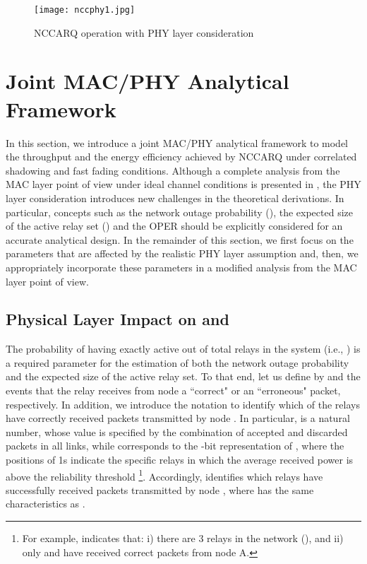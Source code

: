 \documentclass[12pt,draftcls, onecolumn]{IEEEtran}
\begin{document}
\begin{figure}[htb]
\centering
\texttt{[image: nccphy1.jpg]}
\caption{NCCARQ operation with PHY layer consideration}\label{nccphy}
\end{figure}


\section{Joint MAC/PHY Analytical Framework}
\label{sec:analysis}

In this section, we introduce a joint MAC/PHY analytical framework to model the throughput and the energy efficiency achieved by NCCARQ under correlated shadowing and fast fading conditions. Although a complete analysis from the MAC layer point of view under ideal channel conditions is presented in \cite{nccarq}, the PHY layer consideration introduces new challenges in the theoretical derivations. In particular, concepts such as the network outage probability (), the expected size of the active relay set () and the OPER should be explicitly considered for an accurate analytical design. In the remainder of this section, we first focus on the parameters that are affected by the realistic PHY layer assumption and, then, we appropriately incorporate these parameters in a modified analysis from the MAC layer point of view.

\subsection{Physical Layer Impact on  and }
\label{sec3}

The probability of having exactly  active out of  total relays in the system (i.e., ) is a required parameter for the estimation of both the network outage probability and the expected size of the active relay set. To that end, let us define by  and  the events that the relay  receives from node  a ``correct" or an ``erroneous" packet, respectively. In addition, we introduce the notation  to identify which of the  relays have correctly received packets transmitted by node . In particular,  is a natural number, whose value is specified by the combination of accepted and discarded packets in all  links, while  corresponds to the -bit representation of , where the positions of 1s indicate the specific relays in which the average received power  is above the reliability threshold \footnote{For example,  indicates that: i) there are 3 relays in the network (), and ii) only  and  have received correct packets from node A.}. Accordingly,  identifies which relays have successfully received packets transmitted by node , where  has the same characteristics as .
\end{document}
